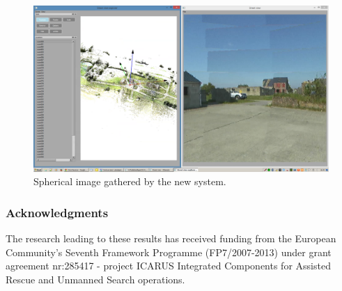 \documentclass{article}
\begin{document}
	
\begin{figure}[h]
\centering
 \includegraphics[width=\textwidth]{ROB-15-0035_fig42.png}
 \caption{Spherical image gathered by the new system.}
 \label{fig:streetview}
 \end{figure}

\subsubsection*{Acknowledgments}
The research leading to these results has received funding from the European Community's Seventh Framework Programme (FP7/2007-2013) under grant agreement nr:285417 - project ICARUS Integrated Components for Assisted Rescue and Unmanned Search operations.


\end{document}
